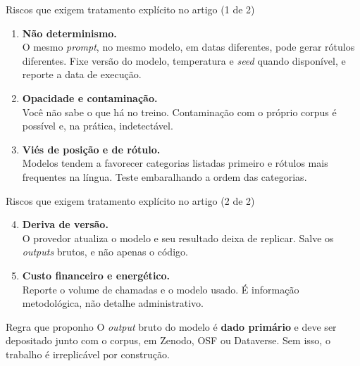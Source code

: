 \documentclass[11pt,aspectratio=169]{beamer}
\begin{document}
\begin{frame}{Riscos que exigem tratamento explícito no artigo (1 de 2)}
\begin{enumerate}
  \item \textbf{Não determinismo.}\\
        \small O mesmo \emph{prompt}, no mesmo modelo, em datas diferentes, pode
        gerar rótulos diferentes. Fixe versão do modelo, temperatura e
        \emph{seed} quando disponível, e reporte a data de execução.
  \vspace{0.2cm}
  \item \normalsize \textbf{Opacidade e contaminação.}\\
        \small Você não sabe o que há no treino. Contaminação com o próprio
        corpus é possível e, na prática, indetectável.
  \vspace{0.2cm}
  \item \normalsize \textbf{Viés de posição e de rótulo.}\\
        \small Modelos tendem a favorecer categorias listadas primeiro e rótulos
        mais frequentes na língua. Teste embaralhando a ordem das categorias.
\end{enumerate}
\end{frame}

\begin{frame}{Riscos que exigem tratamento explícito no artigo (2 de 2)}
\begin{enumerate}\setcounter{enumi}{3}
  \item \textbf{Deriva de versão.}\\
        \small O provedor atualiza o modelo e seu resultado deixa de replicar.
        Salve os \emph{outputs} brutos, e não apenas o código.
  \vspace{0.2cm}
  \item \normalsize \textbf{Custo financeiro e energético.}\\
        \small Reporte o volume de chamadas e o modelo usado. É informação
        metodológica, não detalhe administrativo.
\end{enumerate}
\vspace{0.4cm}
\begin{block}{Regra que proponho}
\small O \emph{output} bruto do modelo é \textbf{dado primário} e deve ser
depositado junto com o corpus, em Zenodo, OSF ou Dataverse. Sem isso, o trabalho
é irreplicável por construção.
\end{block}
\end{frame}
\end{document}
